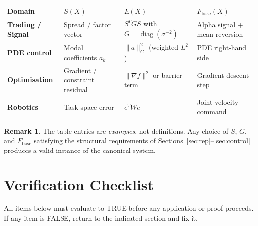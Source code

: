 \documentclass[11pt,oneside]{amsart}
\def\textbf#1{#1}%
\theoremstyle{plain}
\theoremstyle{definition}
\newtheorem{remark}[theorem]{Remark}
\newcommand{\Fbase}{F_{\mathrm{base}}}
\DeclareMathOperator{\diag}{diag}
\begin{document}
\bigskip

\begin{center}
\begin{tabularx}{\linewidth}{>{\bfseries}l X X X}
\toprule
Domain & $S(X)$ & $E(X)$ & $\Fbase(X)$ \\
\midrule
Trading / Signal &
  Spread / factor vector &
  $S^{T}G S$ with $G = \diag(\sigma^{-2})$ &
  Alpha signal + mean reversion \\[4pt]
PDE control &
  Modal coefficients $a_k$ &
  $\|a\|_{G}^{2}$ (weighted $L^{2}$) &
  PDE right-hand side \\[4pt]
Optimisation &
  Gradient / constraint residual &
  $\|\nabla f\|^{2}$ or barrier term &
  Gradient descent step \\[4pt]
Robotics &
  Task-space error &
  $e^{T}W e$ & Joint velocity command \\
\bottomrule
\end{tabularx}
\end{center}

\begin{remark}
The table entries are \emph{examples}, not definitions. Any choice of
$S$, $G$, and $\Fbase$ satisfying the structural requirements of
Sections~\ref{sec:rep}--\ref{sec:control} produces a valid instance of the
canonical system.
\end{remark}

\section{Verification Checklist}
\label{sec:check}

All items below must evaluate to \textbf{TRUE} before any application or proof
proceeds. If any item is FALSE, return to the indicated section and fix it.
\end{document}
